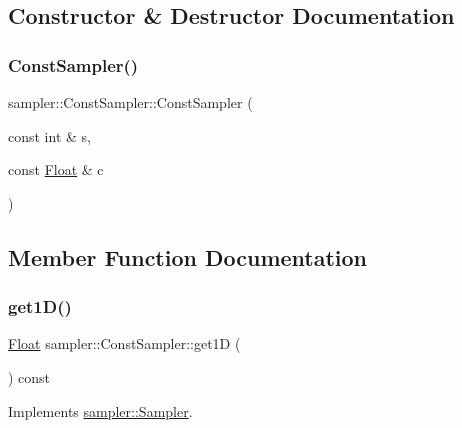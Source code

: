 \subsection{Constructor \& Destructor Documentation}
\mbox{\label{classsampler_1_1ConstSampler_af9859fdd671ce5f3be77eda3d147f667}} 
\subsubsection{\texorpdfstring{ConstSampler()}{ConstSampler()}}
{\footnotesize\ttfamily sampler\+::\+Const\+Sampler\+::\+Const\+Sampler (\begin{DoxyParamCaption}\item[{const int \&}]{s,  }\item[{const \mbox{\hyperlink{cyclop_8hpp_a07afd7094cb489cbd514c76e6f55d34f}{Float}} \&}]{c }\end{DoxyParamCaption})}



\subsection{Member Function Documentation}
\mbox{\label{classsampler_1_1ConstSampler_a5c8a7744e2b2f4170663cb9b9207179d}} 
\subsubsection{\texorpdfstring{get1D()}{get1D()}}
{\footnotesize\ttfamily \mbox{\hyperlink{cyclop_8hpp_a07afd7094cb489cbd514c76e6f55d34f}{Float}} sampler\+::\+Const\+Sampler\+::get1D (\begin{DoxyParamCaption}{ }\end{DoxyParamCaption}) const\hspace{0.3cm}{\ttfamily [virtual]}}



Implements \mbox{\hyperlink{classsampler_1_1Sampler_a1bf2e7752ddd5b44fd291c04ffad3464}{sampler\+::\+Sampler}}.

\mbox{\label{classsampler_1_1ConstSampler_a21897522074763d7a61cbe374ae30dce}} 
